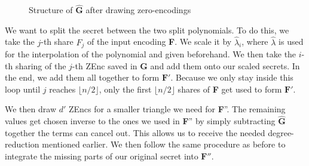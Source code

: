 \documentclass[english, version-2020-11]{uzl-thesis}
\begin{document}
\begin{figure}[htbp]
  \centering
  \caption{Structure of $\hat{\mathbf{G}}$ after drawing zero-encodings}
  \label{fig:G_hat}
\end{figure}
    

    We want to split the secret between the two split polynomials. To do this, we take the $j$-th share $F_j$ of the input encoding \textbf{F}. We scale it by $\hat{\lambda}_i$, where $\hat{\lambda}$ is used for the interpolation of the polynomial and given beforehand. 
    We then take the $i$-th sharing of the $j$-th ZEnc saved in $\mathbf{G}$ and add them onto our scaled secrets. In the end, we add them all together to form $\mathbf{F}'$. Because we only stay inside this loop until $j$ reaches $\lfloor n/2\rfloor$, only the first $\lfloor n/2\rfloor$ shares of \textbf{F} get used to form $\mathbf{F}'$.

    We then draw $d'$ ZEncs for a smaller triangle we need for \textbf{F}''.  The remaining values get chosen inverse to the ones we used in \textbf{F}'' by simply subtracting $\hat{\mathbf{G}}$  
    together the terms can cancel out.
    This allows us to receive the needed degree-reduction mentioned earlier. We then follow the same procedure as before to integrate the missing parts of our original secret into $\mathbf{F}''$.
\end{document}
